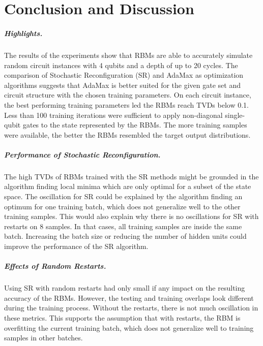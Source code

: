 \chapter{Conclusion and Discussion}
\label{sec:discussion}

\paragraph{Highlights.}
The results of the experiments show that RBMs are able to accurately simulate random circuit 
instances with 4 qubits and a depth of up to 20 cycles. The comparison of 
Stochastic Reconfiguration (SR) and AdaMax as optimization algorithms suggests that 
AdaMax is better suited for the given gate set and circuit structure with the chosen training 
parameters. On each circuit instance, the best performing training parameters led 
the RBMs reach TVDs below 0.1. Less than 100 training iterations were sufficient to 
apply non-diagonal single-qubit gates to the state represented by the RBMs. 
The more training samples were available, the better the RBMs resembled the target output distributions.

\paragraph{Performance of Stochastic Reconfiguration.}
The high TVDs of RBMs trained with the SR methods might be grounded in the algorithm finding 
local minima which are only optimal for a subset of the state space. The oscillation for SR could be explained by the algorithm finding an 
optimum for one training batch, which does not generalize well to the other training samples.
This would also explain why there is no oscillations for SR with restarts on 8 samples. In that
cases, all training samples are inside the same batch. Increasing the batch size or reducing the 
number of hidden units could improve the performance of the SR algorithm.

\paragraph{Effects of Random Restarts.}
Using SR with random restarts had only small if any 
impact on the resulting accuracy of the RBMs. However, the testing and training overlaps 
look different during the training process. Without the restarts, there is not much 
oscillation in these metrics. This supports the assumption that with restarts, the 
RBM is overfitting the current training batch, which does not generalize well to training 
samples in other batches. 

